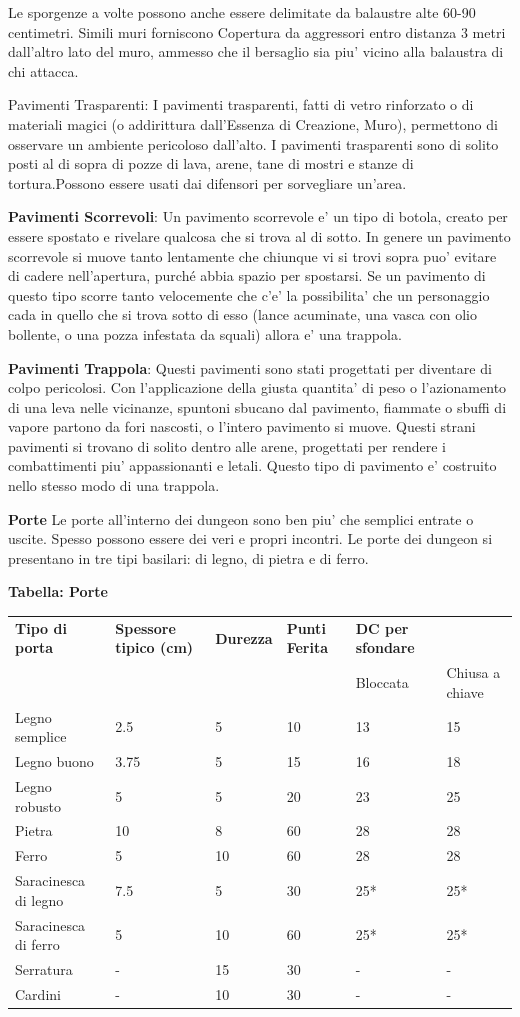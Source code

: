 \documentclass[a4paper,11pt,twoside,openany]{book}
\begin{document}
{		Le sporgenze a volte possono anche essere delimitate da balaustre alte 60-90 centimetri. Simili muri forniscono Copertura da aggressori entro distanza 3 metri dall'altro lato del muro, ammesso che il bersaglio sia piu' vicino alla balaustra di chi attacca.
		
		Pavimenti Trasparenti: I pavimenti trasparenti, fatti di vetro rinforzato o di materiali magici (o addirittura dall'Essenza di Creazione, Muro), permettono di osservare un ambiente pericoloso dall'alto. I pavimenti trasparenti sono di solito posti al di sopra di pozze di lava, arene, tane di mostri e stanze di tortura.Possono essere usati dai difensori 
		per sorvegliare un'area.
		
		\textbf{Pavimenti Scorrevoli}: Un pavimento scorrevole e' un tipo di botola, creato per essere spostato e rivelare qualcosa che si trova al di sotto. In genere un pavimento scorrevole si muove tanto lentamente che chiunque vi si trovi sopra puo' evitare di cadere nell'apertura, purché abbia spazio per spostarsi. Se un pavimento di questo tipo scorre tanto velocemente che c'e' la possibilita' che un personaggio cada in quello che si trova sotto di esso (lance acuminate, una vasca con olio bollente, o una pozza infestata da squali) allora e' una trappola.
		
		\textbf{Pavimenti Trappola}: Questi pavimenti sono stati progettati per diventare di colpo pericolosi. Con l'applicazione della giusta quantita' di peso o l'azionamento di una leva nelle vicinanze, spuntoni sbucano dal pavimento, fiammate o sbuffi di vapore partono da fori nascosti, o l'intero pavimento si muove. Questi strani pavimenti si trovano di solito dentro alle arene, progettati per rendere i combattimenti piu' appassionanti e letali. Questo tipo di pavimento e' costruito nello stesso modo di una trappola.
		
		\textbf{Porte} Le porte all'interno dei dungeon sono ben piu' che semplici entrate o uscite. Spesso possono essere dei veri e propri incontri. Le porte dei dungeon si presentano in tre tipi basilari: di legno, di pietra e di ferro.
		
		\bigskip
		
		\textbf{Tabella: Porte}
		
		\bigskip
		
		\begin{tabular}{L{2.5cm} L{3cm} L{2cm} L{2cm}L{2cm}L{2cm} } 
			\toprule
			\textbf{Tipo di porta} & \textbf{Spessore tipico (cm)} & \textbf{Durezza} & \textbf{Punti Ferita} & \textbf{DC per sfondare} & \tabularnewline
			& & & & Bloccata & Chiusa a chiave\tabularnewline
			Legno semplice & 2.5 & 5 & 10 & 13 & 15\tabularnewline
			Legno buono & 3.75 & 5 & 15 & 16 & 18\tabularnewline
			Legno robusto & 5 & 5 & 20 & 23 & 25\tabularnewline
			Pietra & 10 & 8 & 60 & 28 & 28\tabularnewline
			Ferro & 5 & 10 & 60 & 28 & 28\tabularnewline
			Saracinesca di legno & 7.5 & 5 & 30 & 25{*} & 25{*}\tabularnewline
			Saracinesca di ferro & 5 & 10 & 60 & 25{*} & 25{*}\tabularnewline
			Serratura & - & 15 & 30 & - & -\tabularnewline
			Cardini & - & 10 & 30 & - & -\tabularnewline
		\end{tabular}
		
}
\end{document}
